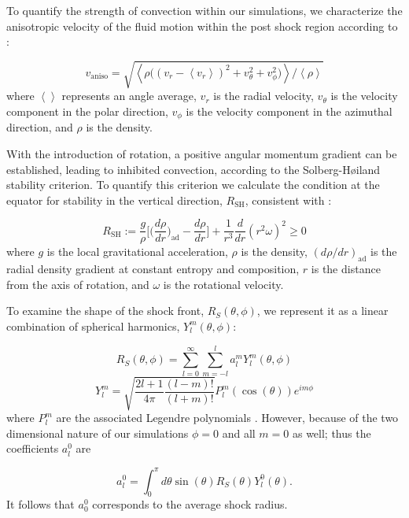 \documentclass[twocolumn,times]{aastex62}  %
\begin{document}
To quantify the strength of convection within our simulations, we characterize the anisotropic velocity of the fluid motion within the post shock region according to \citet{takiwaki:2012}:

\begin{equation}
    v_{\mathrm{aniso}} = \sqrt{\left<\rho\Big((v_r - \left<v_r\right>)^2 + v_\theta^2 + v_\phi^2\Big) \right>/\left<\rho\right>}
\label{eq:vaniso}
\end{equation}
where $\left<\right>$ represents an angle average, $v_r$ is the radial velocity, $v_\theta$ is the velocity component in the polar direction, $v_\phi$ is the velocity component in the azimuthal direction, and $\rho$ is the density.  

With the introduction of rotation, a positive angular momentum gradient can be established, leading to inhibited convection, according to the Solberg-H{\o}iland stability criterion.  To quantify this criterion we calculate the condition at the equator for stability in the vertical direction, $R_{\mathrm{SH}}$, consistent with \citet{heger:2000}:

\begin{equation}
    R_{\mathrm{SH}} := \frac{g}{\rho}\Bigg[\Bigg(\frac{d\rho}{dr}\Bigg)_{\mathrm{ad}}-\frac{d\rho}{dr}\Bigg] + \frac{1}{r^3}\frac{d}{dr}(r^2\omega)^2 \geq 0
\label{eq:SHI}
\end{equation}
where $g$ is the local gravitational acceleration, $\rho$ is the density, $(d\rho/dr)_{\mathrm{ad}}$ is the radial density gradient at constant entropy and composition, $r$ is the distance from the axis of rotation, and $\omega$ is the rotational velocity. 

To examine the shape of the shock front, $R_S(\theta,\phi)$, we represent it as a linear combination of spherical harmonics, $Y_l^m(\theta,\phi)$:

\begin{equation}
    R_S(\theta,\phi) = \sum_{l=0}^\infty \sum_{m=-l}^{l} a_l^m Y_l^m(\theta,\phi)
\end{equation}
\begin{equation}
    Y_l^m = \sqrt{\frac{2l+1}{4\pi}\frac{(l-m)!}{(l+m)!}}P_l^m(\cos(\theta)) e^{im\phi}
\end{equation}
where $P_l^m$ are the associated Legendre polynomials \citep{burrows:2012,takiwaki:2012}.  However, because of the two dimensional nature of our simulations $\phi = 0$ and all $m = 0$ as well; thus the coefficients $a_l^0$ are

\begin{equation}
    a_l^0 = \int_0^\pi d\theta \sin(\theta)R_S(\theta)Y_l^0(\theta) .
\label{eq:sho_coeff}
\end{equation}
It follows that $a_0^0$ corresponds to the average shock radius.
\end{document}
